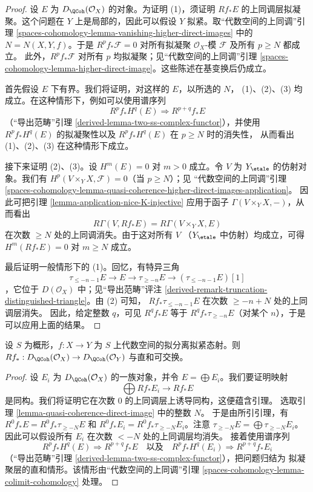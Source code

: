\begin{proof}
设 $E$ 为 $D_\QCoh(\mathcal{O}_X)$ 的对象。为证明 (1)，须证明
$Rf_*E$ 的上同调层拟凝聚。这个问题在 $Y$ 上是局部的，因此可以假设
$Y$ 拟紧。取“代数空间的上同调”引理
\ref{spaces-cohomology-lemma-vanishing-higher-direct-images} 中的
$N = N(X, Y, f)$。于是 $R^pf_*\mathcal{F} = 0$ 对所有拟凝聚
$\mathcal{O}_X$-模 $\mathcal{F}$ 及所有 $p \geq N$ 都成立。
此外，$R^pf_*\mathcal{F}$ 对所有 $p$ 均拟凝聚；见“代数空间的上同调”引理
\ref{spaces-cohomology-lemma-higher-direct-image}。这些陈述在基变换后仍成立。

\medskip\noindent
首先假设 $E$ 下有界。我们将证明，对这样的 $E$，以所选的 $N$，
(1)、(2)、(3) 均成立。在这种情形下，例如可以使用谱序列
$$
R^pf_*H^q(E) \Rightarrow R^{p + q}f_*E
$$
（“导出范畴”引理 \ref{derived-lemma-two-ss-complex-functor}），并使用
$R^pf_*H^q(E)$ 的拟凝聚性以及 $R^pf_*H^q(E)$ 在 $p \geq N$ 时的消失性，
从而看出 (1)、(2)、(3) 在这种情形下成立。

\medskip\noindent
接下来证明 (2)、(3)。设 $H^m(E) = 0$ 对 $m > 0$ 成立。令
$V$ 为 $Y_\etale$ 的仿射对象。我们有
$H^p(V \times_Y X, \mathcal{F}) = 0$（当 $p \geq N$）；见
“代数空间的上同调”引理
\ref{spaces-cohomology-lemma-quasi-coherence-higher-direct-images-application}。
因此可把引理 \ref{lemma-application-nice-K-injective} 应用于函子
$\Gamma(V \times_Y X, -)$，从而看出
$$
R\Gamma(V, Rf_*E) = R\Gamma(V \times_Y X, E)
$$
在次数 $\geq N$ 处的上同调消失。由于这对所有 $V$
（$Y_\etale$ 中仿射）均成立，可得 $H^m(Rf_*E) = 0$ 对
$m \geq N$ 成立。

\medskip\noindent
最后证明一般情形下的 (1)。回忆，有特异三角
$$
\tau_{\leq -n - 1}E \to E \to \tau_{\geq -n}E \to
(\tau_{\leq -n - 1}E)[1]
$$
，它位于 $D(\mathcal{O}_X)$ 中；见“导出范畴”评注
\ref{derived-remark-truncation-distinguished-triangle}。由 (2) 可知，
$Rf_*\tau_{\leq -n - 1}E$ 在次数 $\geq -n + N$ 处的上同调层消失。
因此，给定整数 $q$，可见 $R^qf_*E$ 等于
$R^qf_*\tau_{\geq -n}E$（对某个 $n$），于是可以应用上面的结果。
\end{proof}

\begin{lemma}
\label{lemma-quasi-coherence-pushforward-direct-sums}
设 $S$ 为概形，$f : X \to Y$ 为 $S$ 上代数空间的拟分离拟紧态射。则
$Rf_* : D_\QCoh(\mathcal{O}_X) \to D_\QCoh(\mathcal{O}_Y)$
与直和可交换。
\end{lemma}

\begin{proof}
设 $E_i$ 为 $D_\QCoh(\mathcal{O}_X)$ 的一族对象，并令
$E = \bigoplus E_i$。我们要证明映射
$$
\bigoplus Rf_*E_i \longrightarrow Rf_*E
$$
是同构。我们将证明它在次数 $0$ 的上同调层上诱导同构，这便蕴含引理。
选取引理 \ref{lemma-quasi-coherence-direct-image} 中的整数 $N$。
于是由所引引理，有 $R^0f_*E = R^0f_*\tau_{\geq -N}E$ 和
$R^0f_*E_i = R^0f_*\tau_{\geq -N}E_i$。注意
$\tau_{\geq -N}E = \bigoplus \tau_{\geq -N}E_i$。
因此可以假设所有 $E_i$ 在次数 $< -N$ 处的上同调层均消失。
接着使用谱序列
$$
R^pf_*H^q(E) \Rightarrow R^{p + q}f_*E
\quad\text{以及}\quad
R^pf_*H^q(E_i) \Rightarrow R^{p + q}f_*E_i
$$
（“导出范畴”引理 \ref{derived-lemma-two-ss-complex-functor}），把问题归结为
拟凝聚层的直和情形。该情形由“代数空间的上同调”引理
\ref{spaces-cohomology-lemma-colimit-cohomology} 处理。
\end{proof}

